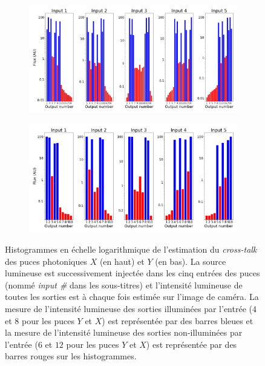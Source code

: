 \begin{figure}[ht!]
    \centering
    \begin{subfigure}{0.8\textwidth}
        \centering
        \includegraphics[width=\textwidth]{Figure_Chap2/20201124_5TC_5OutputFluxesLog_OOptics_LaTex.png}
    \end{subfigure}
    \begin{subfigure}{0.8\textwidth}
        \centering
        \includegraphics[width=\textwidth]{Figure_Chap2/20201119_5TC_5OutputFluxesLog_OOptics_LaTex.png}
    \end{subfigure}
    \caption[Histogrammes de l'estimation du \textit{cross-talk} des puces photoniques $X$ et $Y$.]{Histogrammes en échelle logarithmique de l'estimation du \textit{cross-talk} des puces photoniques $X$ (en haut) et $Y$ (en bas). La source lumineuse est successivement injectée dans les cinq entrées des puces (nommé \textit{input \#} dans les sous-titres) et l'intensité lumineuse de toutes les sorties est à chaque fois estimée sur l'image de caméra. La mesure de l'intensité lumineuse des sorties illuminées par l'entrée ($4$ et $8$ pour les puces $Y$ et $X$) est représentée par des barres bleues et la mesure de l'intensité lumineuse des sorties non-illuminées par l'entrée ($6$ et $12$ pour les puces $Y$ et $X$) est représentée par des barres rouges sur les histogrammes.}
    \label{fig:ChipCrossTalk}
\end{figure}


